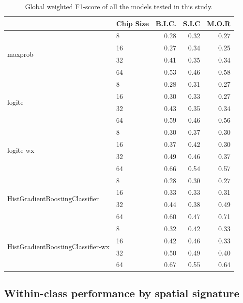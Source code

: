 \begin{table}
    \centering
\begin{tabular}{llrrr}
    \toprule
     & Chip Size & B.I.C. & S.I.C & M.O.R \\
    \midrule
    \multirow[t]{4}{*}{maxprob} & 8 & 0.28 & 0.32 & 0.27 \\
    & 16 & 0.27 & 0.34 & 0.25 \\
    & 32 & 0.41 & 0.35 & 0.34 \\
    & 64 & 0.53 & 0.46 & 0.58 \\
   \cline{1-5}
   \multirow[t]{4}{*}{logite} & 8 & 0.28 & 0.31 & 0.27 \\
    & 16 & 0.30 & 0.33 & 0.27 \\
    & 32 & 0.43 & 0.35 & 0.34 \\
    & 64 & 0.59 & 0.46 & 0.56 \\
   \cline{1-5}
   \multirow[t]{4}{*}{logite-wx} & 8 & 0.30 & 0.37 & 0.30 \\
    & 16 & 0.37 & 0.42 & 0.30 \\
    & 32 & 0.49 & 0.46 & 0.37 \\
    & 64 & 0.66 & 0.54 & 0.57 \\
   \cline{1-5}
   \multirow[t]{4}{*}{HistGradientBoostingClassifier} & 8 & 0.28 & 0.30 & 0.27 \\
    & 16 & 0.33 & 0.33 & 0.31 \\
    & 32 & 0.44 & 0.38 & 0.49 \\
    & 64 & 0.60 & 0.47 & 0.71 \\
   \cline{1-5}
   \multirow[t]{4}{*}{HistGradientBoostingClassifier-wx} & 8 & 0.32 & 0.42 & 0.33 \\
    & 16 & 0.42 & 0.46 & 0.33 \\
    & 32 & 0.50 & 0.49 & 0.40 \\
    & 64 & 0.67 & 0.55 & 0.64 \\
    \bottomrule
\end{tabular}
\caption{\label{tab:global_weigted_f1}\footnotesize Global weighted F1-score of all the models
tested in this study.}
\end{table}

\subsection{Within-class performance by spatial signature}
\label{sec:appendixB}

